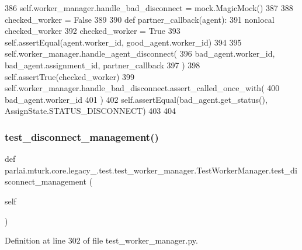 \begin{DoxyCode}
386         self.worker\_manager.handle\_bad\_disconnect = mock.MagicMock()
387 
388         checked\_worker = \textcolor{keyword}{False}
389 
390         \textcolor{keyword}{def }partner\_callback(agent):
391             nonlocal checked\_worker
392             checked\_worker = \textcolor{keyword}{True}
393             self.assertEqual(agent.worker\_id, good\_agent.worker\_id)
394 
395         self.worker\_manager.handle\_agent\_disconnect(
396             bad\_agent.worker\_id, bad\_agent.assignment\_id, partner\_callback
397         )
398         self.assertTrue(checked\_worker)
399         self.worker\_manager.handle\_bad\_disconnect.assert\_called\_once\_with(
400             bad\_agent.worker\_id
401         )
402         self.assertEqual(bad\_agent.get\_status(), AssignState.STATUS\_DISCONNECT)
403 
404 
\end{DoxyCode}
\mbox{\label{classparlai_1_1mturk_1_1core_1_1legacy__2018_1_1test_1_1test__worker__manager_1_1TestWorkerManager_a64ed45c4f124cf9a6dba3716b65e858f}} 
\subsubsection{\texorpdfstring{test\+\_\+disconnect\+\_\+management()}{test\_disconnect\_management()}}
{\footnotesize\ttfamily def parlai.\+mturk.\+core.\+legacy\+\_.\+test.\+test\+\_\+worker\+\_\+manager.\+Test\+Worker\+Manager.\+test\+\_\+disconnect\+\_\+management (\begin{DoxyParamCaption}\item[{}]{self }\end{DoxyParamCaption})}



Definition at line 302 of file test\+\_\+worker\+\_\+manager.\+py.


